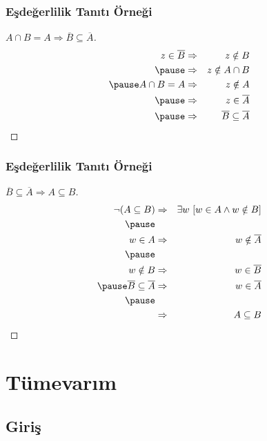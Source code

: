 \documentclass[dvipsnames]{beamer}
\theoremstyle{definition}
\theoremstyle{example}
\theoremstyle{plain}
\begin{document}
\begin{frame}
  \frametitle{Eşdeğerlilik Tanıtı Örneği}

  \begin{proof}[$A \cap B = A \Rightarrow \overline{B} \subseteq \overline{A}$]
    \begin{eqnarray*}
      z \in \overline{B} & \Rightarrow & z \notin B\\\pause
                         & \Rightarrow & z \notin A \cap B\\\pause
      A \cap B = A       & \Rightarrow & z \notin A\\\pause
                         & \Rightarrow & z \in \overline{A}\\\pause
                         & \Rightarrow & \overline{B} \subseteq \overline{A}
    \end{eqnarray*}
  \end{proof}
\end{frame}

\begin{frame}
  \frametitle{Eşdeğerlilik Tanıtı Örneği}

  \begin{proof}[$\overline{B} \subseteq \overline{A} \Rightarrow A \subseteq B$]
    \begin{eqnarray*}
      \neg (A \subseteq B) & \Rightarrow & \exists w~[w \in A \wedge w \notin B]\\\pause
                 &             &                      \\
      w \in A    & \Rightarrow & w \notin \overline{A}\\\pause
                 &             &                      \\
      w \notin B & \Rightarrow & w \in \overline{B}\\\pause
      \overline{B} \subseteq \overline{A}  & \Rightarrow & w \in \overline{A}\\\pause
                 &             &                      \\
                 & \Rightarrow & A \subseteq B
    \end{eqnarray*}
  \end{proof}
\end{frame}

\section{Tümevarım}

\subsection{Giriş}
\end{document}
